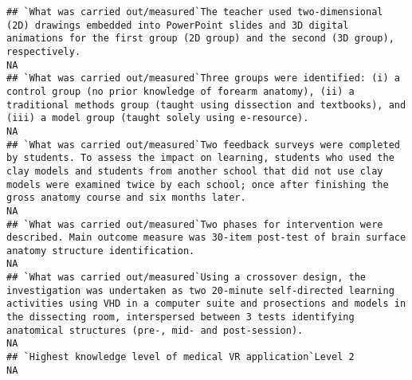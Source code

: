 \documentclass[]{article}
\begin{document}
\begin{verbatim}
## `What was carried out/measured`The teacher used two-dimensional (2D) drawings embedded into PowerPoint slides and 3D digital animations for the first group (2D group) and the second (3D group), respectively.                                                                                                                                                                                                                                                                       NA
## `What was carried out/measured`Three groups were identified: (i) a control group (no prior knowledge of forearm anatomy), (ii) a traditional methods group (taught using dissection and textbooks), and (iii) a model group (taught solely using e-resource).                                                                                                                                                                                                                         NA
## `What was carried out/measured`Two feedback surveys were completed by students. To assess the impact on learning, students who used the clay models and students from another school that did not use clay models were examined twice by each school; once after finishing the gross anatomy course and six months later.                                                                                                                                                             NA
## `What was carried out/measured`Two phases for intervention were described. Main outcome measure was 30-item post-test of brain surface anatomy structure identification.                                                                                                                                                                                                                                                                                                              NA
## `What was carried out/measured`Using a crossover design, the investigation was undertaken as two 20-minute self-directed learning activities using VHD in a computer suite and prosections and models in the dissecting room, interspersed between 3 tests identifying anatomical structures (pre-, mid- and post-session).                                                                                                                                                           NA
## `Highest knowledge level of medical VR application`Level 2                                                                                                                                                                                                                                                                                                                                                                                                                            NA

\end{verbatim}
\end{document}
